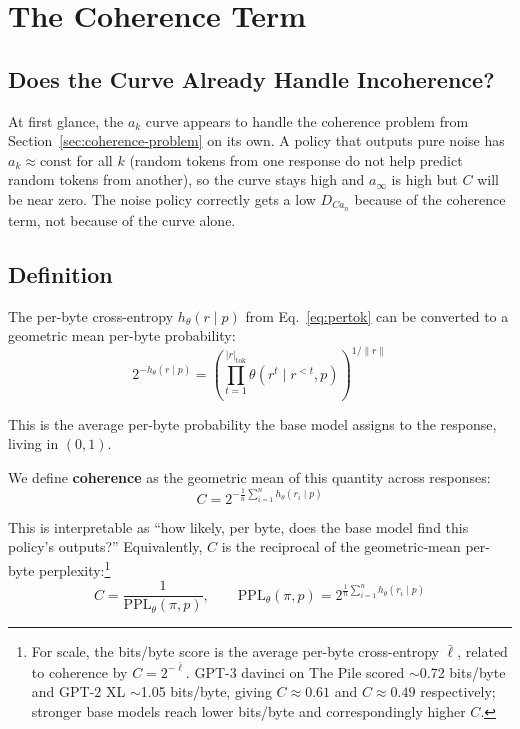 \section{The Coherence Term}\label{sec:coherence}

\subsection{Does the Curve Already Handle Incoherence?}

At first glance, the $a_k$ curve appears to handle the coherence problem from Section~\ref{sec:coherence-problem} on its own.
A policy that outputs pure noise has $a_k \approx \mathrm{const}$ for all $k$ (random tokens from one response do not help predict random tokens from another), so the curve stays high and $a_\infty$ is high but $C$ will be near zero.
The noise policy correctly gets a low $D_{Ca_n}$ because of the coherence term, not because of the curve alone.

\subsection{Definition}

The per-byte cross-entropy $h_\theta(r \mid p)$ from Eq.~\eqref{eq:pertok} can be converted to a geometric mean per-byte probability:
\begin{equation}
    2^{-h_\theta(r \mid p)} = \left(\prod_{t=1}^{|r|_{\mathrm{tok}}} \theta(r^t \mid r^{<t}, p)\right)^{1/\|r\|}
\end{equation}

This is the average per-byte probability the base model assigns to the response, living in $(0,1)$.

We define \textbf{coherence} as the geometric mean of this quantity across responses:
\begin{equation}\label{eq:coherence}
    C = 2^{-\frac{1}{n}\sum_{i=1}^{n} h_\theta(r_i \mid p)}
\end{equation}

This is interpretable as ``how likely, per byte, does the base model find this policy's outputs?''
Equivalently, $C$ is the reciprocal of the geometric-mean per-byte perplexity:\footnote{For scale, the bits/byte score is the average per-byte cross-entropy $\bar{\ell}$, related to coherence by $C = 2^{-\bar{\ell}}$. GPT-3 davinci on The Pile \citep{gao2020pile} scored $\sim$0.72 bits/byte and GPT-2 XL $\sim$1.05 bits/byte, giving $C \approx 0.61$ and $C \approx 0.49$ respectively; stronger base models reach lower bits/byte and correspondingly higher $C$.}
\begin{equation}
    C = \frac{1}{\mathrm{PPL}_\theta(\pi, p)}, \qquad \mathrm{PPL}_\theta(\pi, p) = 2^{\frac{1}{n}\sum_{i=1}^{n} h_\theta(r_i \mid p)}
\end{equation}

